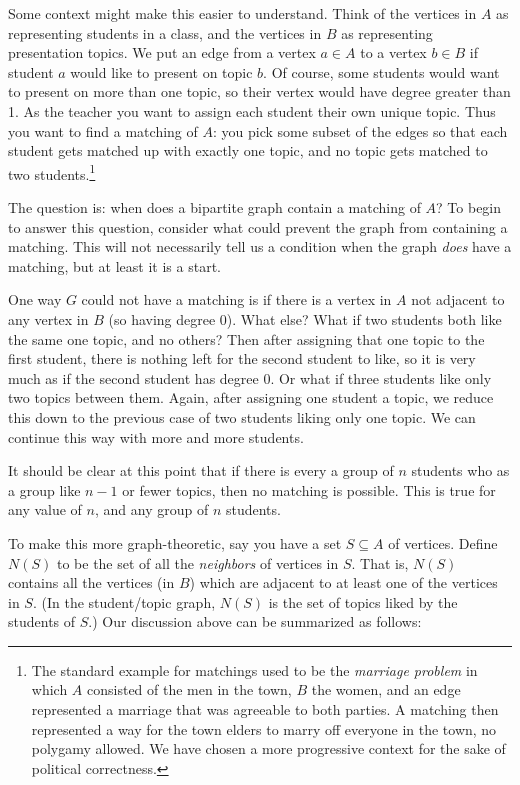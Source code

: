 \documentclass[12pt]{article}
\begin{document}
Some context might make this easier to understand.  Think of the vertices in $A$ as representing students in a class, and the vertices in $B$ as representing presentation topics.  We put an edge from a vertex  $a \in A$ to a vertex $b \in B$ if student $a$ would like to present on topic $b$.  Of course, some students would want to present on more than one topic, so their vertex would have degree greater than 1.  As the teacher you want to assign each student their own unique topic.  Thus you want to find a matching of $A$: you pick some subset of the edges so that each student gets matched up with exactly one topic, and no topic gets matched to two students.\footnote{The standard example for matchings used to be the {\em marriage problem} in which $A$ consisted of the men in the town, $B$ the women, and an edge represented a marriage that was agreeable to both parties.  A matching then represented a way for the town elders to marry off everyone in the town, no polygamy allowed.  We have chosen a more progressive context for the sake of political correctness.}

The question is: when does a bipartite graph contain a matching of $A$?  To begin to answer this question, consider what could prevent the graph from containing a matching.  This will not necessarily tell us a condition when the graph {\em does} have a matching, but at least it is a start.

One way $G$ could not have a matching is if there is a vertex in $A$ not adjacent to any vertex in $B$ (so having degree 0).  What else?  What if two students both like the same one topic, and no others?  Then after assigning that one topic to the first student, there is nothing left for the second student to like, so it is very much as if the second student has degree 0.  Or what if three students like only two topics between them.  Again, after assigning one student a topic, we reduce this down to the previous case of two students liking only one topic.  We can continue this way with more and more students.

It should be clear at this point that if there is every a group of $n$ students who as a group like $n-1$ or fewer topics, then no matching is possible.  This is true for any value of $n$, and any group of $n$ students.  

To make this more graph-theoretic, say you have a set $S \subseteq A$ of vertices.  Define $N(S)$ to be the set of all the {\em neighbors} of vertices in $S$.  That is, $N(S)$ contains all the vertices (in $B$) which are adjacent to at least one of the vertices in $S$.  (In the student/topic graph, $N(S)$ is the set of topics liked by the students of $S$.)  Our discussion above can be summarized as follows:
\end{document}
